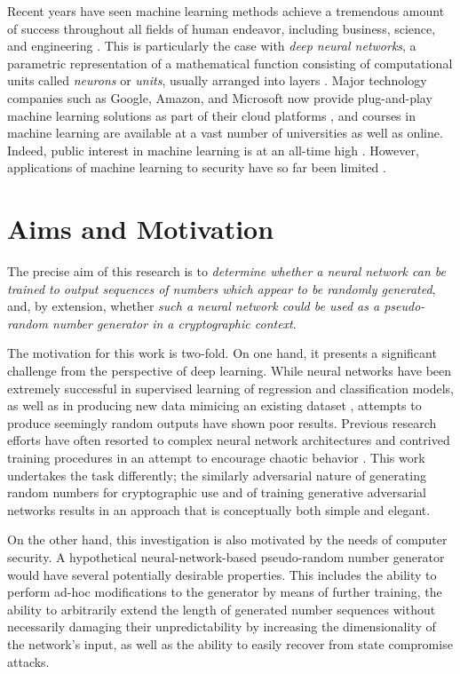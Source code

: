 \documentclass[12pt, titlepage]{report}
\theoremstyle{definition}
\begin{document}
Recent years have seen machine learning methods achieve a tremendous amount of success throughout all fields of human endeavor, including business, science, and engineering \cite[p. 24-29]{russel2009artificial}. This is particularly the case with \emph{deep neural networks}, a parametric representation of a mathematical function consisting of computational units called \emph{neurons} or \emph{units}, usually arranged into layers \cite[p. 731-732]{russel2009artificial}. Major technology companies such as Google, Amazon, and Microsoft now provide plug-and-play machine learning solutions as part of their cloud platforms \cite{google2018automl} \cite{amazon2018aws} \cite{microsoft2018azure}, and courses in machine learning are available at a vast number of universities as well as online. Indeed, public interest in machine learning is at an all-time high \cite{forbes2016short}. However, applications of machine learning to security have so far been limited \cite{abadi2016learning}.

\section{Aims and Motivation}\label{subsection:aims}
The precise aim of this research is to \emph{determine whether a neural network can be trained to output sequences of numbers which appear to be randomly generated}, and, by extension, whether \emph{such a neural network could be used as a pseudo-random number generator in a cryptographic context}. 

The motivation for this work is two-fold. On one hand, it presents a significant challenge from the perspective of deep learning. While neural networks have been extremely successful in supervised learning of regression and classification models, as well as in producing new data mimicing an existing dataset \cite{goodfellow2014generative}, attempts to produce seemingly random outputs have shown poor results. Previous research efforts have often resorted to complex neural network architectures and contrived training procedures in an attempt to encourage chaotic behavior \cite{desai2011pseudo} \cite{desai2012pseudo} \cite{tirdad2010hopfield}. This work undertakes the task differently; the similarly adversarial nature of generating random numbers for cryptographic use and of training generative adversarial networks results in an approach that is conceptually both simple and elegant.

On the other hand, this investigation is also motivated by the needs of computer security. A hypothetical neural-network-based pseudo-random number generator would have several potentially desirable properties. This includes the ability to perform ad-hoc modifications to the generator by means of further training, the ability to arbitrarily extend the length of generated number sequences without necessarily damaging their unpredictability by increasing the dimensionality of the network's input, as well as the ability to easily recover from state compromise attacks. 
\end{document}
